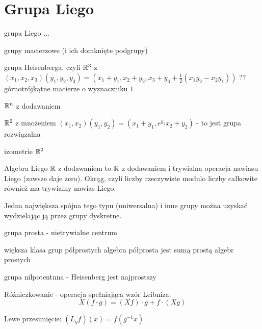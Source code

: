 \section{Grupa Liego}

\begin{definition}{grupa Liego}{}
  ...
\end{definition}

\begin{example}[m]
  \item grupy macierzowe (i ich domknięte podgrupy)
  \item grupa Heisenberga, czyli $\mathbb{R}^3$ z $(x_1, x_2, x_3)(y_1, y_2, y_3)=(x_1+y_1, x_2+y_2, x_3+y_3+\frac{1}{2}(x_1y_2-x_2y_1))$ ?? górnotrójkątne macierze o wyznaczniku $1$
  \item $\mathbb{R}^n$ z dodawaniem
  \item $\mathbb{R}^2$ z mnożeniem $(x_1, x_2)(y_1, y_2)=(x_1+y_1, e^{y_1}x_2+y_2)$ - to jest grupa rozwiązalna
  \item izometrie $\mathbb{R}^2$
\end{example}

Algebra Liego $\mathbb{R}$ z dodawaniem to $\mathbb{R}$ z dodawaniem i trywialna operacja nawiasu Liego (zawsze daje zero). Okrąg, czyli liczby rzeczywiste modulo liczby całkowite również ma trywialny nawias Liego.

Jedna największa spójna tego typu (uniwersalna) i inne grupy można uzyskać wydzielając ją przez grupy dyskretne.

grupa prosta - nietrywialne centrum

większa klasa grup półprostych
algebra półprosta jest sumą prostą algebr prostych

grupa nilpotentnna - Heisenberg jest najprostszy

Różniczkowanie - operacja spełniająca wzór Leibniza:
$$X(f\cdot g) = (Xf)\cdot g+f\cdot (Xg)$$

Lewe przesunięcie:
$(L_gf)(x)=f(g^{-1}x)$



